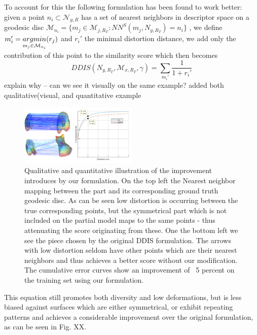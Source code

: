 \documentclass[10pt,twocolumn,letterpaper]{article}
\begin{document}
To account for this the following formulation has been found to work better: given a point $n_i\subset \mathcal{N}_{y,R}$ has a set of nearest neighbors in descriptor space on a geodesic disc 
$\mathcal{M}_{n_i}=\{m_j\in\mathcal{M}_{j,R_T}:NN^S(m_j,N_{y,R_T})=n_i\}$ 
, we define 
$m_i' = \underset{m_j\in\mathcal{M}_{n_i}}{argmin}\space (r_j)$
and $r_i'$ the minimal distortion distance, we add only the contribution of this point to the similarity score which then becomes
\begin{equation}
DDIS(N_{y,R_T},\mathcal{M}_{x,R_T},\gamma)=\sum_{m_i'}\frac{1}{1+r_i'}
\end{equation}
{\color{red} explain why -- can we see it visually on the same example?}{\color{green} added both qualitative(visual, and quantitative example}\\
\begin{figure}[htb]
	\includegraphics[width=0.5\textwidth]{figures/DDISvsWDIS.png}
	\caption{Qualitative and quantitative illustration of the improvement introduces by our formulation. On the top left the Nearest neighbor mapping between the part and its corresponding ground truth geodesic disc. As can be seen low distortion is occurring between the true corresponding points, but the symmetrical part which is not included on the partial model maps to the same points - thus attenuating the score originating from these. One the bottom left we see the piece chosen by the original DDIS formulation. The arrows with low distortion seldom have other points which are their nearest neighbors and thus achieves a better score without our modification. The cumulative error curves show an improvement of ~5 percent on the training set using our formulation.}
\end{figure}
This equation still promotes both diversity and low deformations, but is less biased against surfaces which are either symmetrical, or exhibit repeating patterns and achieves a considerable improvement over the original formulation, as can be seen in Fig. XX.

\end{document}
